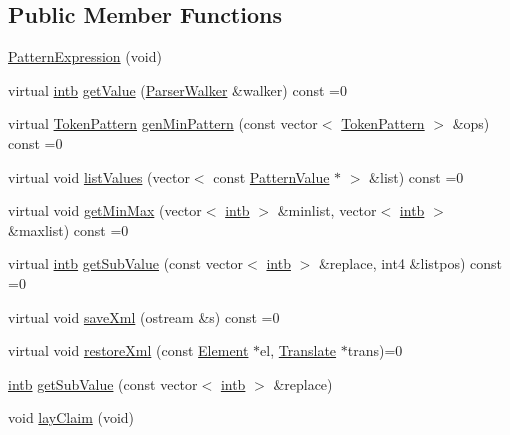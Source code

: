 \subsection*{Public Member Functions}
\begin{DoxyCompactItemize}
\item 
\mbox{\hyperlink{class_pattern_expression_abbb0f85fbbbaf66e5638356bcca53bc8}{Pattern\+Expression}} (void)
\item 
virtual \mbox{\hyperlink{types_8h_aa925ba3e627c2df89d5b1cfe84fb8572}{intb}} \mbox{\hyperlink{class_pattern_expression_a8332c6ea4c5a7e9dfc690df2a6458bb8}{get\+Value}} (\mbox{\hyperlink{class_parser_walker}{Parser\+Walker}} \&walker) const =0
\item 
virtual \mbox{\hyperlink{class_token_pattern}{Token\+Pattern}} \mbox{\hyperlink{class_pattern_expression_a1dc2d0c07f64fdab9da6c0849e992b50}{gen\+Min\+Pattern}} (const vector$<$ \mbox{\hyperlink{class_token_pattern}{Token\+Pattern}} $>$ \&ops) const =0
\item 
virtual void \mbox{\hyperlink{class_pattern_expression_a48d1a8fce687ba5c272b2e0d72760363}{list\+Values}} (vector$<$ const \mbox{\hyperlink{class_pattern_value}{Pattern\+Value}} $\ast$ $>$ \&list) const =0
\item 
virtual void \mbox{\hyperlink{class_pattern_expression_a4ceb88e89308ac58bf1af4174228f3a0}{get\+Min\+Max}} (vector$<$ \mbox{\hyperlink{types_8h_aa925ba3e627c2df89d5b1cfe84fb8572}{intb}} $>$ \&minlist, vector$<$ \mbox{\hyperlink{types_8h_aa925ba3e627c2df89d5b1cfe84fb8572}{intb}} $>$ \&maxlist) const =0
\item 
virtual \mbox{\hyperlink{types_8h_aa925ba3e627c2df89d5b1cfe84fb8572}{intb}} \mbox{\hyperlink{class_pattern_expression_ade37db4aa76dd442b189bf4a6bb2d9dd}{get\+Sub\+Value}} (const vector$<$ \mbox{\hyperlink{types_8h_aa925ba3e627c2df89d5b1cfe84fb8572}{intb}} $>$ \&replace, int4 \&listpos) const =0
\item 
virtual void \mbox{\hyperlink{class_pattern_expression_a0d9c89ffbf4a22fac68189a845cde92a}{save\+Xml}} (ostream \&s) const =0
\item 
virtual void \mbox{\hyperlink{class_pattern_expression_ad8986afdddbe7a8b64fdcf10478b5715}{restore\+Xml}} (const \mbox{\hyperlink{class_element}{Element}} $\ast$el, \mbox{\hyperlink{class_translate}{Translate}} $\ast$trans)=0
\item 
\mbox{\hyperlink{types_8h_aa925ba3e627c2df89d5b1cfe84fb8572}{intb}} \mbox{\hyperlink{class_pattern_expression_a0842ac84a9b84a426730ddaf1ef1e509}{get\+Sub\+Value}} (const vector$<$ \mbox{\hyperlink{types_8h_aa925ba3e627c2df89d5b1cfe84fb8572}{intb}} $>$ \&replace)
\item 
void \mbox{\hyperlink{class_pattern_expression_a922b328bd6bea398bf294e505378cee0}{lay\+Claim}} (void)
\end{DoxyCompactItemize}
